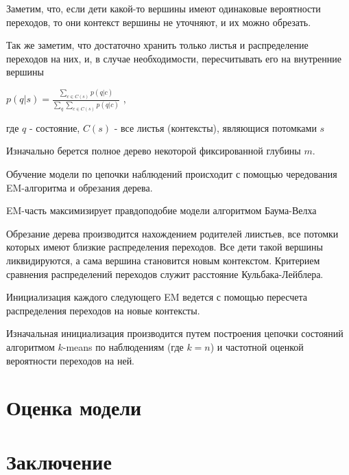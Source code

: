 \documentclass[10pt,a4paper]{article}
\begin{document}
Заметим, что, если дети какой-то вершины имеют одинаковые вероятности переходов, то они контекст вершины не уточняют, и их можно обрезать.

Так же заметим, что достаточно хранить только листья и распределение переходов на них, и, в случае необходимости, пересчитывать его на внутренние вершины 

$ p(q|s) = \frac{\sum_{c \in C(s)} {p(q|c)}}{\sum_q\sum_{c \in C(s)} {p(q|c)}} $ ,

где $ q $ - состояние, $ C(s )$ - все листья (контексты), являющися потомками $ s $

Изначально берется полное дерево некоторой фиксированной глубины $m$.

Обучение модели по цепочки наблюдений происходит с помощью чередования EM-алгоритма и обрезания дерева. 

EM-часть максимизирует правдоподобие модели алгоритмом Баума-Велха

Обрезание дерева производится нахождением родителей лиистьев, все потомки которых имеют близкие распределения переходов. Все дети такой вершины ликвидируются, а сама вершина становится новым контекстом. Критерием сравнения распределений переходов служит расстояние Кульбака-Лейблера. 

Инициализация каждого следующего EM ведется с помощью пересчета распределения переходов на новые контексты.

Изначальная инициализация производится путем построения цепочки состояний алгоритмом $ k $-means по наблюдениям (где $k=n$) и частотной оценкой вероятности переходов на ней.

\section{Оценка модели}

\section{Заключение}



\end{document}
